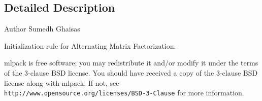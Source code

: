 \subsection{Detailed Description}
\begin{DoxyAuthor}{Author}
Sumedh Ghaisas
\end{DoxyAuthor}
Initialization rule for Alternating Matrix Factorization.

mlpack is free software; you may redistribute it and/or modify it under the terms of the 3-\/clause B\+SD license. You should have received a copy of the 3-\/clause B\+SD license along with mlpack. If not, see {\tt http\+://www.\+opensource.\+org/licenses/\+B\+S\+D-\/3-\/\+Clause} for more information. 